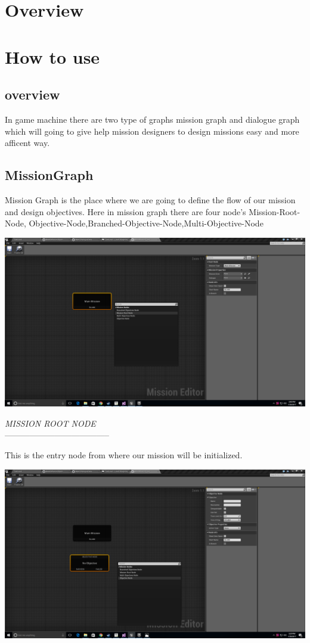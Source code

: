 \documentclass[12pt]{article}
\begin{document}
\section{Overview}
\section{How to use}
	  \subsection{overview}
	  In game machine there are two type of graphs mission graph and dialogue graph which will going to give help mission designers to design missions easy and more afficent way.   
	  \subsection{MissionGraph}
	  Mission Graph is the place where we are going to define the flow of our mission and design objectives.
	  Here in mission graph there are four node's Mission-Root-Node, Objective-Node,Branched-Objective-Node,Multi-Objective-Node
	  \begin{center}
	  \includegraphics[scale=0.2]{MissionRootNode.png}
	  \end{center}
	  \begin{center}
	  \textit{MISSION ROOT NODE}\\
	  --------------------------------------
	  \end{center}
	  This is the entry node from where our mission will be initialized.
	  \begin{center}
	  \includegraphics[scale=0.2]{ObjectiveNode.png}
	  \end{center}
\end{document}
